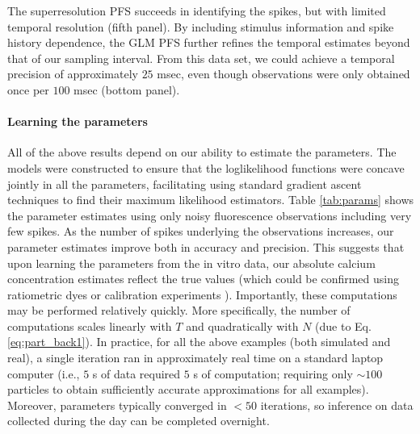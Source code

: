 \documentclass[10pt]{article}
\begin{document}
The superresolution PFS succeeds in identifying the spikes, but with limited temporal resolution (fifth panel).  By including stimulus information and spike history dependence, the GLM PFS further refines the temporal estimates beyond that of our sampling interval.  From this data set, we could achieve a temporal precision of approximately $25$ msec, even though observations were only obtained once per $100$ msec (bottom panel).  %

\paragraph{Learning the parameters}

All of the above results depend on our ability to estimate the parameters. The models were constructed to ensure that the loglikelihood functions were concave jointly in all the parameters, facilitating using standard gradient ascent techniques to find their maximum likelihood estimators. Table \ref{tab:params} shows the parameter estimates using only noisy fluorescence observations including very few spikes. As the number of spikes underlying the observations increases, our parameter estimates improve both in accuracy and precision.  This suggests that upon learning the parameters from the in vitro data, our absolute calcium concentration estimates reflect the true values (which could be confirmed using ratiometric dyes or calibration experiments \cite{YasudaSvoboda04}). Importantly, these computations may be performed relatively quickly. More specifically, the number of computations scales linearly with $T$ and quadratically with $N$ (due to Eq. \ref{eq:part_back1}).  In practice, for all the above examples (both simulated and real), a single iteration ran in approximately real time on a standard laptop computer (i.e., $5$ s of data required $5$ s of computation; requiring only $\sim 100$ particles to obtain sufficiently accurate approximations for all examples). Moreover, parameters typically converged in $<50$ iterations, so inference on data collected during the day can be completed overnight.  %
\end{document}
